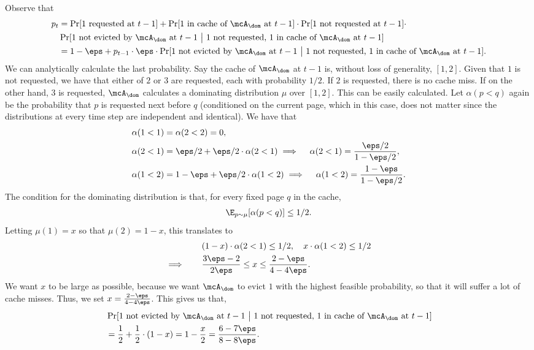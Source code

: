 Observe that 
\begin{align*}
    p_t &= \Pr[\text{$1$ requested at $t-1$}] + \Pr[\text{$1$ in cache of $\mcA_\dom$ at $t-1$}] \cdot \Pr[\text{$1$ not requested at $t-1$}] \cdot \\
    &\Pr[\text{$1$ not evicted by $\mcA_\dom$ at $t-1 ~\big|$ $1$ not requested, $1$ in cache of $\mcA_\dom$ at $t-1$}] \\
    &= 1-\eps + p_{t-1} \cdot \eps \cdot \Pr[\text{$1$ not evicted by $\mcA_\dom$ at $t-1 ~\big|$ $1$ not requested, $1$ in cache of $\mcA_\dom$ at $t-1$}].
\end{align*}
We can analytically calculate the last probability. Say the cache of $\mcA_\dom$ at $t-1$ is, without loss of generality, $[1,2]$. Given that $1$ is not requested, we have that either of $2$ or $3$ are requested, each with probability $1/2$. If $2$ is requested, there is no cache miss. If on the other hand, $3$ is requested, $\mcA_\dom$ calculates a dominating distribution $\mu$ over $[1,2]$. This can be easily calculated. Let $\alpha(p<q)$ again be the probability that $p$ is requested next before $q$ (conditioned on the current page, which in this case, does not matter since the distributions at every time step are independent and identical). We have that
\begin{align*}
    &\alpha(1<1) = \alpha(2<2) = 0, \\
    &\alpha(2<1) = \eps/2 + \eps/2 \cdot \alpha(2<1)
    \implies \quad \alpha(2<1) = \frac{\eps/2}{1-\eps/2}, \\
    &\alpha(1<2) = 1-\eps + \eps/2 \cdot \alpha(1<2)
    \implies \quad \alpha(1<2) = \frac{1-\eps}{1-\eps/2}. 
\end{align*}
The condition for the dominating distribution is that, for every fixed page $q$ in the cache,
\begin{align*}
    \E_{p \sim \mu}[\alpha(p<q)] \le 1/2.
\end{align*}
Letting $\mu(1)=x$ so that $\mu(2)=1-x$, this translates to
\begin{align*}
    &(1-x)\cdot \alpha(2<1) \le 1/2, \quad x\cdot \alpha(1<2) \le 1/2 \\
    \implies \qquad& \frac{3\eps-2}{2\eps} \le x \le \frac{2-\eps}{4-4\eps}.
\end{align*}
We want $x$ to be large as possible, because we want $\mcA_\dom$ to evict $1$ with the highest feasible probability, so that it will suffer a lot of cache misses. Thus, we set $x = \frac{2-\eps}{4-4\eps}$. This gives us that,
\begin{align*}
    &\Pr[\text{$1$ not evicted by $\mcA_\dom$ at $t-1 ~\big|$ $1$ not requested, $1$ in cache of $\mcA_\dom$ at $t-1$}] \\
    &= \frac12 + \frac{1}{2} \cdot (1-x) = 1-\frac{x}{2} = \frac{6-7\eps}{8-8\eps}.
\end{align*}

